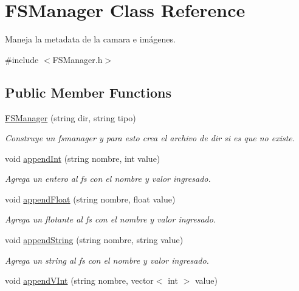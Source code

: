 \hypertarget{classFSManager}{}\section{F\+S\+Manager Class Reference}
\label{classFSManager}


Maneja la metadata de la camara e imágenes.  




{\ttfamily \#include $<$F\+S\+Manager.\+h$>$}

\subsection*{Public Member Functions}
\begin{DoxyCompactItemize}
\item 
\mbox{\hyperlink{classFSManager_a888db17ac3bf2a22dfa6a18b6fed99d8}{F\+S\+Manager}} (string dir, string tipo)
\begin{DoxyCompactList}\small\item\em Construye un fsmanager y para esto crea el archivo de \textquotesingle{}dir\textquotesingle{} si es que no existe. \end{DoxyCompactList}\item 
void \mbox{\hyperlink{classFSManager_a3e4672be75f6edf00336adf883571963}{append\+Int}} (string nombre, int value)
\begin{DoxyCompactList}\small\item\em Agrega un entero al fs con el nombre y valor ingresado. \end{DoxyCompactList}\item 
void \mbox{\hyperlink{classFSManager_ae0719c62b330a8053d65fc519f1afb38}{append\+Float}} (string nombre, float value)
\begin{DoxyCompactList}\small\item\em Agrega un flotante al fs con el nombre y valor ingresado. \end{DoxyCompactList}\item 
void \mbox{\hyperlink{classFSManager_a74dc93c38eb23abda9dd5651bf696c17}{append\+String}} (string nombre, string value)
\begin{DoxyCompactList}\small\item\em Agrega un string al fs con el nombre y valor ingresado. \end{DoxyCompactList}\item 
void \mbox{\hyperlink{classFSManager_a5c589c828a37b0d0231fd47436ba63b5}{append\+V\+Int}} (string nombre, vector$<$ int $>$ value)

\end{DoxyCompactItemize}
